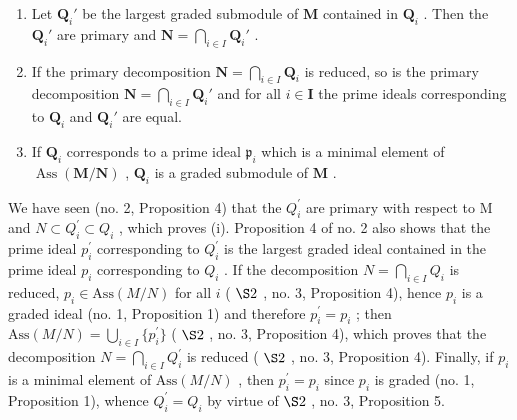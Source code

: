 \begin{enumerate}
\def\labelenumi{(\roman{enumi})}
\item
  Let \(\mathbf{Q}_i'\) be the largest graded submodule of \(\mathbf{M}\) contained in \(\mathbf{Q}_i\) . Then the \(\mathbf{Q}_i'\) are primary and \(\mathbf{N} = \bigcap_{i \in I} \mathbf{Q}_i'\) .
\item
  If the primary decomposition \(\mathbf{N} = \bigcap_{i\in I}\mathbf{Q}_i\) is reduced, so is the primary decomposition \(\mathbf{N} = \bigcap_{i\in I}\mathbf{Q}_i'\) and for all \(i\in \mathbf{I}\) the prime ideals corresponding to \(\mathbf{Q}_i\) and \(\mathbf{Q}_i'\) are equal.
\item
  If \(\mathbf{Q}_i\) corresponds to a prime ideal \(\mathfrak{p}_i\) which is a minimal element of \(\operatorname{Ass}(\mathbf{M} / \mathbf{N})\) , \(\mathbf{Q}_i\) is a graded submodule of \(\mathbf{M}\) .
\end{enumerate}

We have seen (no. 2, Proposition 4) that the \(Q_{i}^{\prime}\) are primary with respect to M and \(N \subset Q_{i}^{\prime} \subset Q_{i}\) , which proves (i). Proposition 4 of no. 2 also shows that the prime ideal \(p_{i}^{\prime}\) corresponding to \(Q_{i}^{\prime}\) is the largest graded ideal contained in the prime ideal \(p_{i}\) corresponding to \(Q_{i}\) . If the decomposition \(N = \bigcap_{i \in I} Q_{i}\) is reduced, \(p_{i} \in \text{Ass}(M/N)\) for all \(i\) ( \(\S 2\) , no. 3, Proposition 4), hence \(p_{i}\) is a graded ideal (no. 1, Proposition 1) and therefore \(p_{i}^{\prime} = p_{i}\) ; then \(\text{Ass}(M/N) = \bigcup_{i \in I} \{p_{i}^{\prime}\}\) ( \(\S 2\) , no. 3, Proposition 4), which proves that the decomposition \(N = \bigcap_{i \in I} Q_{i}^{\prime}\) is reduced ( \(\S 2\) , no. 3, Proposition 4). Finally, if \(p_{i}\) is a minimal element of \(\text{Ass}(M/N)\) , then \(p_{i}^{\prime} = p_{i}\) since \(p_{i}\) is graded (no. 1, Proposition 1), whence \(Q_{i}^{\prime} = Q_{i}\) by virtue of \(\S 2\) , no. 3, Proposition 5.

